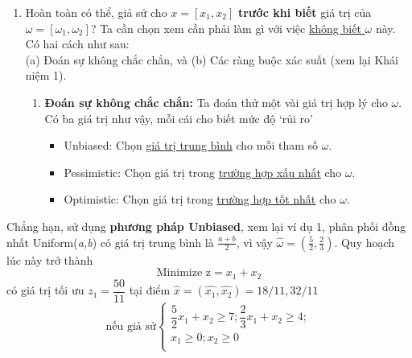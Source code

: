 \documentclass[a4paper]{article}
\begin{document}
\begin{itemize}
\begin{enumerate}
                    \item Hoàn toàn có thể, giả sử cho $x=[x_{1}, x_{2}]$ \textbf{trước khi biết} giá trị của
                    $\omega=[\omega_{1},\omega_{2}]$? Ta cần chọn xem cần phải làm gì với việc \underline{không biết $\omega$} này.
                    Có hai cách như sau:\\(a) Đoán sự không chắc chắn, và (b) Các ràng buộc xác suất (xem lại Khái niệm 1).\\
                        \begin{enumerate}
                            \item \textbf{Đoán sự không chắc chắn:} Ta đoán thử một vài giá trị hợp lý cho $\omega$. Có ba giá trị như vậy, mỗi cái cho biết mức độ `rủi ro'
                                \begin{itemize}
                                    \item Unbiased: Chọn \underline{giá trị trung bình} cho mỗi tham số $\omega$.
                                    \item Pessimistic: Chọn giá trị trong \underline{trường hợp xấu nhất} cho $\omega$.
                                    \item Optimistic: Chọn giá trị trong \underline{trường hợp tốt nhất} cho $\omega$.
                                \end{itemize}
                        \end{enumerate}
                \end{enumerate}
                Chẳng hạn, sử dụng \textbf{phương pháp Unbiased}, xem lại ví dụ 1, phân phối
                đồng nhất Uniform(\textit{a,b}) có giá trị trung bình là $\frac{a+b}{2}$, vì vậy $\hat{\omega}=(\frac{5}{2}, \frac{2}{3})$. Quy hoạch lúc này trở thành
                \begin{displaymath}
                    \text {Minimize z} = x_{1} + x_{2}
                \end{displaymath}
                có giá trị tối ưu $z_{1} = \dfrac{50}{11}$ tại điểm $\hat{x}=(\hat{x_{1}}, \hat{x_{2}})=18/11,32/11$
                    \begin{displaymath}
                        \text{nếu giả sử}
                        \begin{cases}
                            \text{$\dfrac{5}{2}x_{1}+x_{2} \geq 7; \dfrac{2}{3}x_{1} + x_{2} \geq 4;$} \\
                            \text{$x_{1} \geq 0; x_{2} \geq 0$} \\

\end{cases}
\end{displaymath}
\end{itemize}
\end{document}
